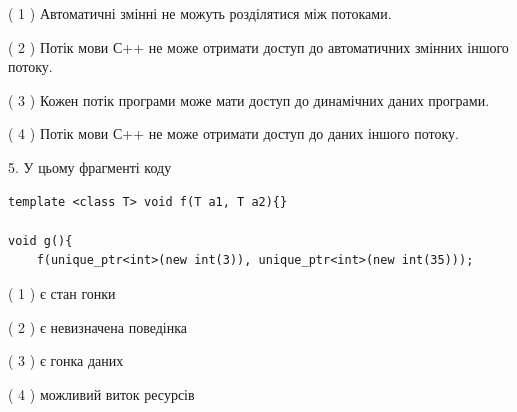 \documentclass[12pt, ukrainian]{article}
\begin{document}
\begin {large}
{( 1 ) Автоматичні змінні не можуть розділятися між потоками.%

( 2 ) Потік мови С++ не може отримати доступ до автоматичних змінних іншого потоку.%

( 3 ) Кожен потік програми може мати доступ до динамічних даних програми.%

( 4 ) Потік мови С++ не може отримати доступ до даних іншого потоку.%


5. У цьому фрагменті коду
\begin{verbatim}
template <class T> void f(T a1, T a2){}

void g(){
    f(unique_ptr<int>(new int(3)), unique_ptr<int>(new int(35)));
\end{verbatim}

( 1 ) є стан гонки%

( 2 ) є невизначена поведінка%

( 3 ) є гонка даних%

( 4 ) можливий виток ресурсів%
}
\end {large}
\end{document}
